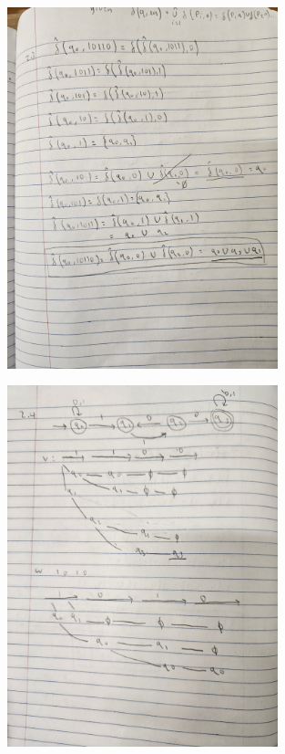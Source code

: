 \documentclass{article}
\theoremstyle{theorem}
\theoremstyle{definition}
\theoremstyle{remark}
\begin{document}
\begin{figure}[H]
    \centering
    \includegraphics[angle=-90, width=0.7\textwidth]{latexImages/hw4-2.2.jpg} 
\end{figure}

\begin{figure}[H]
    \centering
    \includegraphics[angle=-90, width=0.7\textwidth]{latexImages/hw4-2.3.jpg} 
\end{figure}
\end{document}
